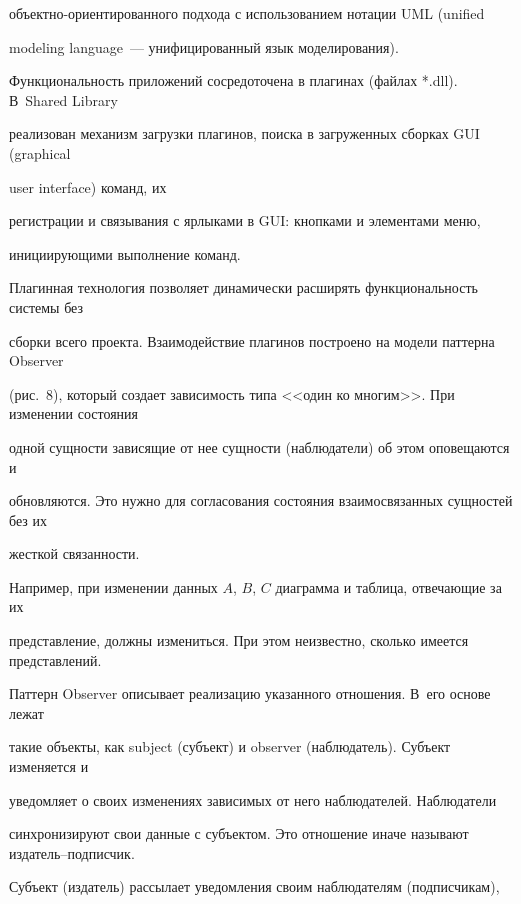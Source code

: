   объект\-но-ори\-ен\-ти\-ро\-ван\-но\-го подхода с использованием нотации UML (unified 


modeling language~--- унифицированный язык моделирования).


  


  Функциональность приложений сосредоточена в плагинах (файлах *.dll). В~Shared Library 


реализован механизм загрузки плагинов, поиска в загруженных сборках GUI (graphical


user interface) ко\-манд, их 


регистрации и связывания с ярлыками в GUI: кнопками и элементами меню, 


инициирующими выполнение команд.


  


  Плагинная технология позволяет динамически расширять функциональность сис\-те\-мы без 


сборки всего проекта. Взаимодействие плагинов построено на модели паттерна Observer 


(рис.~8), который создает зависимость типа <<один ко многим>>. При изменении состояния 


одной сущности зависящие от нее сущности (наблюдатели) об этом оповещаются и 


обновляются. Это нужно для согласования состояния взаимосвязанных сущностей без их 


жесткой связанности.




  Например, при изменении данных $A$, $B$, $C$ диаграмма и таблица, отвечающие за их 


представление, должны измениться. При этом неизвестно, сколько имеется представлений.


  


  Паттерн Observer описывает реализацию указанного отношения. В~его основе лежат 


такие объекты, как subject (субъект) и observer (наблюдатель). Субъект изменяется и 


уведомляет о своих изменениях зависимых от него наблюдателей. Наблюдатели 


синхронизируют свои данные с субъектом. Это отношение иначе называют из\-да\-тель--под\-пис\-чик. 


Субъект (издатель) рассылает уведомления своим наблюдателям (подписчикам), 


